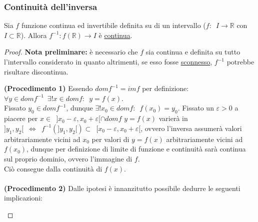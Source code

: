 \documentclass[10pt]{article}
\theoremstyle{plain}
\begin{document}
\subsubsection{Continuità dell'inversa}
\hypertarget{inversa}{\begin{ther}
Sia $f$ funzione continua ed invertibile definita su di un intervallo ($f: \enspace I \rightarrow \mathbb{R}$ con $I \subset \mathbb{R}$). Allora $f^{-1} : f(\mathbb{R}) \rightarrow I$ è \underline{continua}.
\end{ther}}
\begin{proof}
\textbf{Nota preliminare:} è necessario che $f$ sia continua e definita su tutto l'intervallo considerato in quanto altrimenti, se esso fosse \underline{sconnesso}, $f^{-1}$ potrebbe risultare discontinua.
\begin{comment}\begin{center}
\begin{tikzpicture}
\begin{axis}[thick, xmin = 0, xmax = 8, ymin = -0.4, ymax = 4, axis x line = middle, axis y line = middle, ticks=none]
\draw[dashed] (axis cs:5.5,1) -- (axis cs:0,1) node[left]{$y_0$};
\draw[thick] (axis cs:1,0) -- (axis cs:4,1);
\draw[thick] (axis cs:5.5,3) -- (axis cs:9.5,6) node[right]{$f$};
\end{axis}
\end{tikzpicture}
\end{center}
\end{comment}
\textbf{(Procedimento 1)} Essendo $dom f^{-1} = im f$ per definizione: $\forall y \in dom f^{-1} \enspace \exists! x \in dom f : \enspace y = f(x)$.\\
Fissato $y_0 \in dom f^{-1}$, dunque $\exists! x_0 \in dom f : \enspace f(x_0) = y_0$. Fissato un $\varepsilon > 0$ a piacere per $x \in \enspace ] x_0 - \varepsilon, x_0 + \varepsilon[ \cap dom f$ $y = f(x)$ varierà in $]y_1, y_2[ \enspace \Leftrightarrow \enspace f^{-1} (]y_1, y_2[) \subset \enspace [x_0 - \varepsilon, x_0 + \varepsilon[$, ovvero l'inversa assumerà valori arbitrariamente vicini ad $x_0$ per valori di $y=f(x)$ arbitrariamente vicini ad $f(x_0)$, dunque per definizione di limite di funzione e continuità sarà continua sul proprio dominio, ovvero l'immagine di $f$. \\Ciò consegue dalla continuità di $f(x)$.
\\ \\
\textbf{(Procedimento 2)} Dalle ipotesi è innanzitutto possibile dedurre le seguenti implicazioni: \begin{itemize}[label=$\cdot$]

\end{itemize}
\end{proof}
\end{document}
